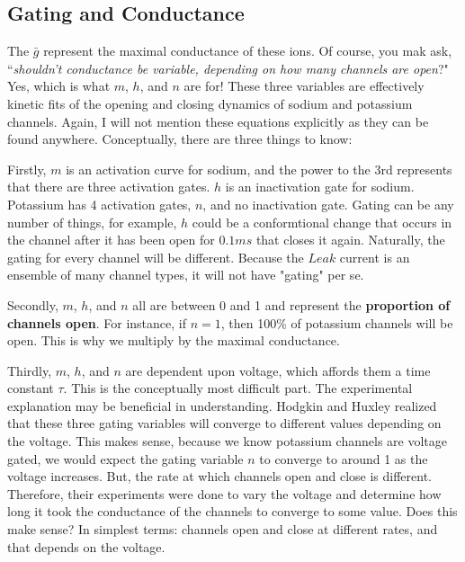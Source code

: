 \documentclass[12pt]{report}
\begin{document}
\subsection{Gating and Conductance} 

\label{sec:GatingandConductance}

The $\bar{g}$ represent the maximal conductance of these ions. Of course, you mak ask, ``\textit{shouldn't conductance be variable, depending on how many channels are open}?" Yes, which is what $m$, $h$, and $n$ are for! These three variables are effectively kinetic fits of the opening and closing dynamics of sodium and potassium channels. Again, I will not mention these equations explicitly as they can be found anywhere. Conceptually, there are three things to know:\newline

Firstly, $m$ is an activation curve for sodium, and the power to the 3rd represents that there are three activation gates. $h$ is an inactivation gate for sodium. Potassium has 4 activation gates, $n$, and no inactivation gate. Gating can be any number of things, for example, $h$ could be a conformtional change that occurs in the channel after it has been open for $0.1 ms$ that closes it again. Naturally, the gating for every channel will be different. Because the $Leak$ current is an ensemble of many channel types, it will not have "gating" per se.\newline

Secondly, $m$, $h$, and $n$ all are between 0 and 1 and represent the \textbf{proportion of channels open}. For instance, if $n = 1$, then 100\% of potassium channels will be open. This is why we multiply by the maximal conductance.\newline

Thirdly, $m$, $h$, and $n$ are dependent upon voltage, which affords them a time constant $\tau$. This is the conceptually most difficult part. The experimental explanation may be beneficial in understanding. Hodgkin and Huxley realized that these three gating variables will converge to different values depending on the voltage. This makes sense, because we know potassium channels are voltage gated, we would expect the gating variable $n$ to converge to around 1 as the voltage increases. But, the rate at which channels open and close is different. Therefore, their experiments were done to vary the voltage and determine how long it took the conductance of the channels to converge to some value. Does this make sense? In simplest terms: channels open and close at different rates, and that depends on the voltage.\newline
\end{document}
